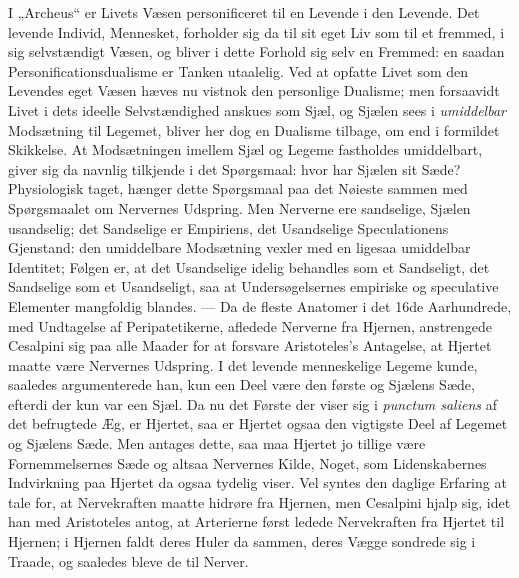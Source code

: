 \documentclass[12pt,a4paper]{book}
\begin{document}
I „Archeus“ er Livets Væsen personificeret til en Levende i den
Levende. Det levende Individ, Mennesket, forholder sig da til sit
eget Liv som til et fremmed, i sig selvstændigt Væsen, og bliver i
dette Forhold sig selv en Fremmed: en saadan Personificationsdualisme
er Tanken utaalelig. Ved at opfatte Livet som den Levendes eget
Væsen hæves nu vistnok den personlige Dualisme; men forsaavidt Livet
i dets ideelle Selvstændighed anskues som Sjæl, og Sjælen sees i
\emph{umiddelbar} Modsætning til Legemet, bliver her dog en Dualisme
tilbage, om end i formildet Skikkelse. At Modsætningen imellem Sjæl
og Legeme fastholdes umiddelbart, giver sig da navnlig tilkjende i
det Spørgsmaal: hvor har Sjælen sit Sæde? Physiologisk taget, hænger
dette Spørgsmaal paa det Nøieste sammen med Spørgsmaalet om
Nervernes Udspring. Men Nerverne ere sandselige, Sjælen usandselig;
det Sandselige er Empiriens, det Usandselige Speculationens
Gjenstand: den umiddelbare Modsætning vexler med en ligesaa
umiddelbar Identitet; Følgen er, at det Usandselige idelig behandles
som et Sandseligt, det Sandselige som et Usandseligt, saa at
Undersøgelsernes empiriske og speculative Elementer mangfoldig
blandes. --- Da de fleste Anatomer i det 16de Aarhundrede, med
Undtagelse af Peripatetikerne, afledede Nerverne fra Hjernen,
anstrengede Cesalpini sig paa alle Maader for at forsvare
Aristoteles's Antagelse, at Hjertet maatte være Nervernes Udspring. I
det levende menneskelige Legeme kunde,
saaledes argumenterede han, kun een Deel være den første og Sjælens
Sæde, efterdi der kun var een Sjæl. Da nu det Første der viser sig i
\textit{punctum saliens} af det befrugtede Æg, er Hjertet, saa er
Hjertet ogsaa den vigtigste Deel af Legemet og Sjælens Sæde. Men
antages dette, saa maa Hjertet jo tillige være Fornemmelsernes Sæde
og altsaa Nervernes Kilde, Noget, som Lidenskabernes Indvirkning paa
Hjertet da ogsaa tydelig viser. Vel syntes den daglige Erfaring at
tale for, at Nervekraften maatte hidrøre fra Hjernen, men Cesalpini
hjalp sig, idet han med Aristoteles antog, at Arterierne først
ledede Nervekraften fra Hjertet til Hjernen; i Hjernen faldt deres
Huler da sammen, deres Vægge sondrede sig i Traade, og saaledes
bleve de til Nerver.
\end{document}
